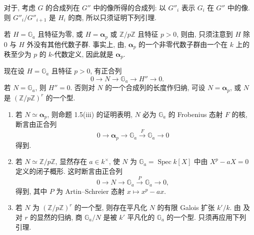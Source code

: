 对于, 考虑 \(G\) 的合成列在 \(G''\)
中的像所得的合成列: 以 \(G''_i\) 表示 \(G_i\) 在 \(G''\) 中的像.
则 \(G''_i/G''_{i+1}\) 是 \(H_i\) 的商, 所以只须证明下列引理.


若 \(H=\mathbb G_a\) 且特征为零, 或 \(H=\boldsymbol\alpha_p\) 或 \(\mathbb Z/p\mathbb Z\)
且特征 \(p>0\), 则由,
只须注意到 \(H\) 除 \(0\) 与 \(H\) 外没有其他代数子群.
事实上, 由,
\(\boldsymbol\alpha_p\) 的一个非零代数子群由一个在 \(k\) 上的秩至少为 \(p\)
的 \(k\)-代数定义, 因此就是 \(\boldsymbol\alpha_p\).

现在设 \(H=\mathbb G_a\) 且特征 \(p>0\), 有正合列
\[
  0\longrightarrow N\longrightarrow\mathbb G_a
    \longrightarrow H''\longrightarrow0.
\]
若 \(N=\mathbb G_a\), 则 \(H''=0\). 否则对 \(N\) 的一个合成列的长度作归纳,
可设 \(N=\boldsymbol\alpha_p\), 或 \(N\) 是 \((\mathbb Z/p\mathbb Z)^r\) 的一个型.

\begin{enumerate}
\item[\rm(a)] 若 \(N\simeq\boldsymbol\alpha_p\), 则命题 1.5(iii) 的证明表明,
\(N\) 必为 \(\mathbb G_a\) 的 Frobenius 态射 \(F\) 的核, 断言由正合列
  \[
    0\longrightarrow\boldsymbol\alpha_p\longrightarrow\mathbb G_a
      \xrightarrow{F}\mathbb G_a\longrightarrow0
  \]
得到.
\item[\rm(b)] 若 \(N\simeq\mathbb Z/p\mathbb Z\), 显然存在 \(a\in k^\times\),
使 \(N\) 为 \(\mathbb G_a=\operatorname{Spec}k[X]\) 中由 \(X^p-aX=0\) 定义的闭子概形.
这时断言由正合列
  \[
    0\longrightarrow N\longrightarrow\mathbb G_a
      \xrightarrow{P}\mathbb G_a\longrightarrow0,
  \]
得到, 其中 \(P\) 为 Artin--Schreier 态射 \(x\mapsto x^p-ax\).
\item[\rm(c)] 若 \(N\) 为 \((\mathbb Z/p\mathbb Z)^r\) 的一个型,
则存在平凡化 \(N\) 的有限 Galois 扩张 \(k'/k\).
由 及对 \(r\) 的显然的归纳,
商 \(\mathbb G_a/N\) 是被 \(k'\) 平凡化的 \(\mathbb G_a\) 的一个型.
只须再应用下列引理.
\end{enumerate}


